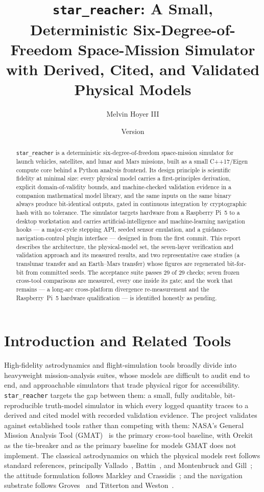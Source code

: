 \documentclass[10pt]{article}
\title{\texttt{star\_reacher}: A Small, Deterministic Six-Degree-of-Freedom
  Space-Mission Simulator with Derived, Cited, and Validated Physical Models}
\author{Melvin Hoyer III}
\date{Version \texttt{\starversion}}
\begin{document}
\maketitle

\begin{abstract}
\texttt{star\_reacher} is a deterministic six-degree-of-freedom space-mission
simulator for launch vehicles, satellites, and lunar and Mars missions, built
as a small C++17/Eigen compute core behind a Python analysis frontend. Its
design principle is scientific fidelity at minimal size: every physical model
carries a first-principles derivation, explicit domain-of-validity bounds, and
machine-checked validation evidence in a companion mathematical model library,
and the same inputs on the same binary always produce bit-identical outputs,
gated in continuous integration by cryptographic hash with no tolerance. The
simulator targets hardware from a Raspberry Pi~5 to a desktop workstation and
carries artificial-intelligence and machine-learning navigation hooks --- a
major-cycle stepping API, seeded sensor emulation, and a
guidance-navigation-control plugin interface --- designed in from the first
commit. This report describes the architecture, the physical-model set, the
seven-layer verification and validation approach and its measured results, and
two representative case studies (a translunar transfer and an Earth--Mars
transfer) whose figures are regenerated bit-for-bit from committed seeds. The
acceptance suite passes \num{29} of \num{29} checks; seven frozen cross-tool
comparisons are measured, every one inside its gate; and the work that remains
--- a long-arc cross-platform divergence re-measurement and the
Raspberry~Pi~5 hardware qualification --- is identified honestly as pending.
\end{abstract}

\section{Introduction and Related Tools}
\label{sec:intro}

High-fidelity astrodynamics and flight-simulation tools broadly divide into
heavyweight mission-analysis suites, whose models are difficult to audit end to
end, and approachable simulators that trade physical rigor for accessibility.
\texttt{star\_reacher} targets the gap between them: a small, fully auditable,
bit-reproducible truth-model simulator in which every logged quantity traces to
a derived and cited model with recorded validation evidence. The project
validates against established tools rather than competing with them: NASA's
General Mission Analysis Tool (GMAT)~\cite{hughes2014} is the primary
cross-tool baseline, with Orekit~\cite{maisonobe2010} as the tie-breaker and as
the primary baseline for models GMAT does not implement. The classical
astrodynamics on which the physical models rest follows standard references,
principally Vallado~\cite{vallado2013}, Battin~\cite{battin1999}, and
Montenbruck and Gill~\cite{montenbruck2000}; the attitude formulation follows
Markley and Crassidis~\cite{markley2014}; and the navigation substrate follows
Groves~\cite{groves2013} and Titterton and Weston~\cite{titterton2004}.
\end{document}
